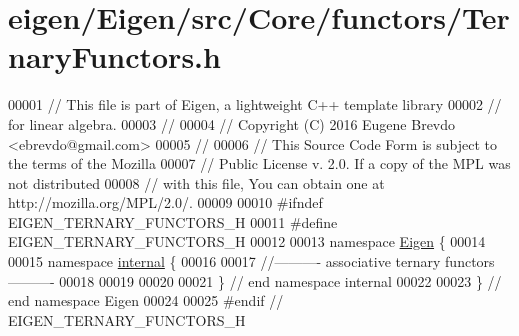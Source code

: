 \hypertarget{eigen_2_eigen_2src_2_core_2functors_2_ternary_functors_8h_source}{}\section{eigen/\+Eigen/src/\+Core/functors/\+Ternary\+Functors.h}
\label{eigen_2_eigen_2src_2_core_2functors_2_ternary_functors_8h_source}

\begin{DoxyCode}
00001 \textcolor{comment}{// This file is part of Eigen, a lightweight C++ template library}
00002 \textcolor{comment}{// for linear algebra.}
00003 \textcolor{comment}{//}
00004 \textcolor{comment}{// Copyright (C) 2016 Eugene Brevdo <ebrevdo@gmail.com>}
00005 \textcolor{comment}{//}
00006 \textcolor{comment}{// This Source Code Form is subject to the terms of the Mozilla}
00007 \textcolor{comment}{// Public License v. 2.0. If a copy of the MPL was not distributed}
00008 \textcolor{comment}{// with this file, You can obtain one at http://mozilla.org/MPL/2.0/.}
00009 
00010 \textcolor{preprocessor}{#ifndef EIGEN\_TERNARY\_FUNCTORS\_H}
00011 \textcolor{preprocessor}{#define EIGEN\_TERNARY\_FUNCTORS\_H}
00012 
00013 \textcolor{keyword}{namespace }\hyperlink{namespace_eigen}{Eigen} \{
00014 
00015 \textcolor{keyword}{namespace }\hyperlink{namespaceinternal}{internal} \{
00016 
00017 \textcolor{comment}{//---------- associative ternary functors ----------}
00018 
00019 
00020 
00021 \} \textcolor{comment}{// end namespace internal}
00022 
00023 \} \textcolor{comment}{// end namespace Eigen}
00024 
00025 \textcolor{preprocessor}{#endif // EIGEN\_TERNARY\_FUNCTORS\_H}
\end{DoxyCode}
